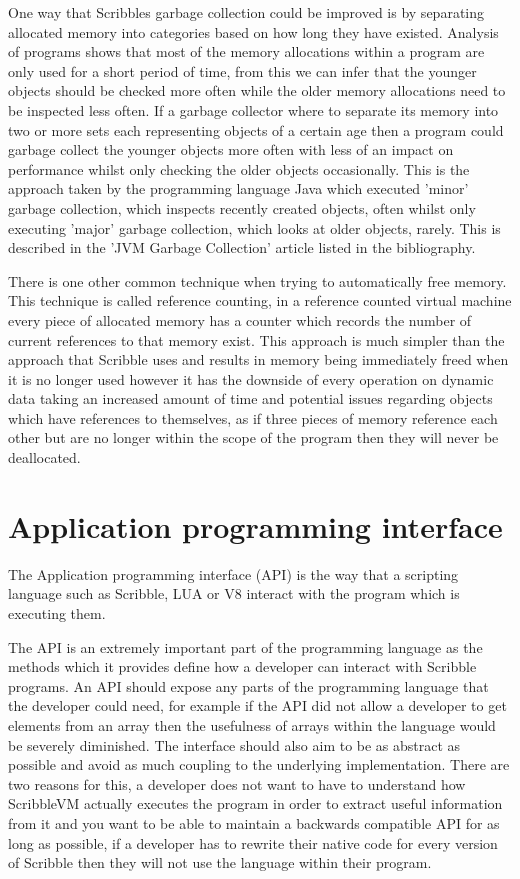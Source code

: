 \documentclass[]{final_report}
\begin{document}
One way that Scribbles garbage collection could be improved is by separating allocated memory into categories based on how long they have existed. Analysis of programs shows that most of the memory allocations within a program are only used for a short period of time, from this we can infer that the younger objects should be checked more often while the older memory allocations need to be inspected less often. If a garbage collector where to separate its memory into two or more sets each representing objects of a certain age then a program could garbage collect the younger objects more often with less of an impact on performance whilst only checking the older objects occasionally. This is the approach taken by the programming language Java which executed 'minor' garbage collection, which inspects recently created objects, often whilst only executing 'major' garbage collection, which looks at older objects, rarely. This is described in the 'JVM Garbage Collection' article listed in the bibliography.

There is one other common technique when trying to automatically free memory. This technique is called reference counting, in a reference counted virtual machine every piece of allocated memory has a counter which records the number of current references to that memory exist. This approach is much simpler than the approach that Scribble uses and results in memory being immediately freed when it is no longer used however it has the downside of every operation on dynamic data taking an increased amount of time and potential issues regarding objects which have references to themselves, as if three pieces of memory reference each other but are no longer within the scope of the program then they will never be deallocated.

\chapter{Application programming interface}

The Application programming interface (API) is the way that a scripting language such as Scribble, LUA or V8 interact with the program which is executing them.

The API is an extremely important part of the programming language as the methods which it provides define how a developer can interact with Scribble programs. An API should expose any parts of the programming language that the developer could need, for example if the API did not allow a developer to get elements from an array then the usefulness of arrays within the language would be severely diminished. The interface should also aim to be as abstract as possible and avoid as much coupling to the underlying implementation. There are two reasons for this, a developer does not want to have to understand how ScribbleVM actually executes the program in order to extract useful information from it and you want to be able to maintain a backwards compatible API for as long as possible, if a developer has to rewrite their native code for every version of Scribble then they will not use the language within their program.
\end{document}
